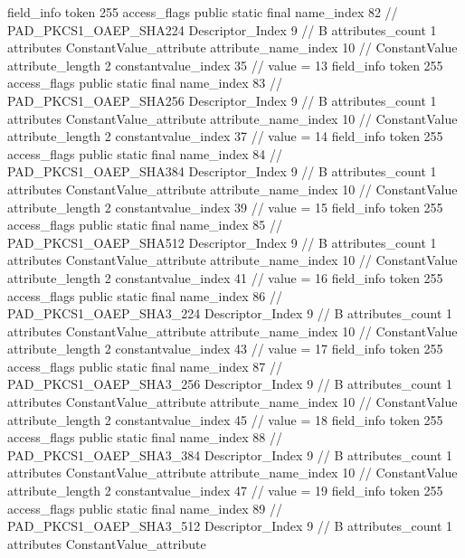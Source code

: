 {{{{			field_info {
				token	255
				access_flags	public static final
				name_index	82		// PAD_PKCS1_OAEP_SHA224
				Descriptor_Index	9		// B
				attributes_count	1
				attributes {
				ConstantValue_attribute {
					attribute_name_index	10		// ConstantValue
					attribute_length	2
					constantvalue_index	35		// value = 13
				}
				}
			}
			field_info {
				token	255
				access_flags	public static final
				name_index	83		// PAD_PKCS1_OAEP_SHA256
				Descriptor_Index	9		// B
				attributes_count	1
				attributes {
				ConstantValue_attribute {
					attribute_name_index	10		// ConstantValue
					attribute_length	2
					constantvalue_index	37		// value = 14
				}
				}
			}
			field_info {
				token	255
				access_flags	public static final
				name_index	84		// PAD_PKCS1_OAEP_SHA384
				Descriptor_Index	9		// B
				attributes_count	1
				attributes {
				ConstantValue_attribute {
					attribute_name_index	10		// ConstantValue
					attribute_length	2
					constantvalue_index	39		// value = 15
				}
				}
			}
			field_info {
				token	255
				access_flags	public static final
				name_index	85		// PAD_PKCS1_OAEP_SHA512
				Descriptor_Index	9		// B
				attributes_count	1
				attributes {
				ConstantValue_attribute {
					attribute_name_index	10		// ConstantValue
					attribute_length	2
					constantvalue_index	41		// value = 16
				}
				}
			}
			field_info {
				token	255
				access_flags	public static final
				name_index	86		// PAD_PKCS1_OAEP_SHA3_224
				Descriptor_Index	9		// B
				attributes_count	1
				attributes {
				ConstantValue_attribute {
					attribute_name_index	10		// ConstantValue
					attribute_length	2
					constantvalue_index	43		// value = 17
				}
				}
			}
			field_info {
				token	255
				access_flags	public static final
				name_index	87		// PAD_PKCS1_OAEP_SHA3_256
				Descriptor_Index	9		// B
				attributes_count	1
				attributes {
				ConstantValue_attribute {
					attribute_name_index	10		// ConstantValue
					attribute_length	2
					constantvalue_index	45		// value = 18
				}
				}
			}
			field_info {
				token	255
				access_flags	public static final
				name_index	88		// PAD_PKCS1_OAEP_SHA3_384
				Descriptor_Index	9		// B
				attributes_count	1
				attributes {
				ConstantValue_attribute {
					attribute_name_index	10		// ConstantValue
					attribute_length	2
					constantvalue_index	47		// value = 19
				}
				}
			}
			field_info {
				token	255
				access_flags	public static final
				name_index	89		// PAD_PKCS1_OAEP_SHA3_512
				Descriptor_Index	9		// B
				attributes_count	1
				attributes {
				ConstantValue_attribute {
}}}}}}}

